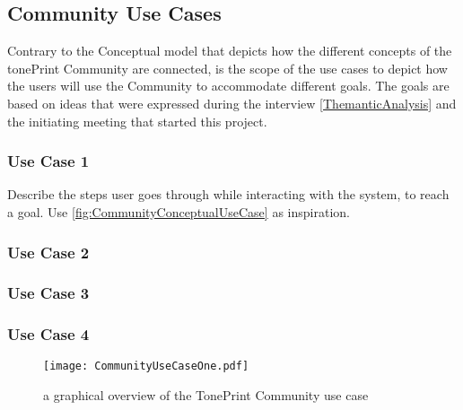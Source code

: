 \subsection{Community Use Cases}
\label{CommunityUseCases}
Contrary to the Conceptual model that depicts how the different concepts of the tonePrint Community are connected, is the scope of the use cases to depict how the users will use the Community to accommodate different goals. The goals are based on ideas that were expressed during the interview \autoref{ThemanticAnalysis} and the initiating meeting that started this project. 

\subsubsection{Use Case 1}
\label{UseCase1}
Describe the steps user goes through while interacting with the system, to reach a goal. Use \autoref{fig:CommunityConceptualUseCase} as inspiration.

\subsubsection{Use Case 2}
\label{UseCase2}

\subsubsection{Use Case 3}
\label{UseCase3}

\subsubsection{Use Case 4}
\label{UseCase4}


\begin{figure}
	\centering
	\texttt{[image: CommunityUseCaseOne.pdf]}
	\caption{a graphical overview of the TonePrint Community use case}
	\label{fig:CommunityConceptualUseCase}
\end{figure}